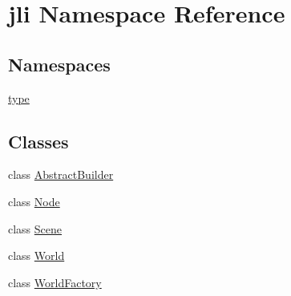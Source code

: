 \hypertarget{namespacejli}{\section{jli Namespace Reference}
\label{namespacejli}
}
\subsection*{Namespaces}
\begin{DoxyCompactItemize}
\item 
 \hyperlink{namespacejli_1_1type}{type}
\end{DoxyCompactItemize}
\subsection*{Classes}
\begin{DoxyCompactItemize}
\item 
class \hyperlink{classjli_1_1_abstract_builder}{Abstract\+Builder}
\item 
class \hyperlink{classjli_1_1_node}{Node}
\item 
class \hyperlink{classjli_1_1_scene}{Scene}
\item 
class \hyperlink{classjli_1_1_world}{World}
\item 
class \hyperlink{classjli_1_1_world_factory}{World\+Factory}
\end{DoxyCompactItemize}
